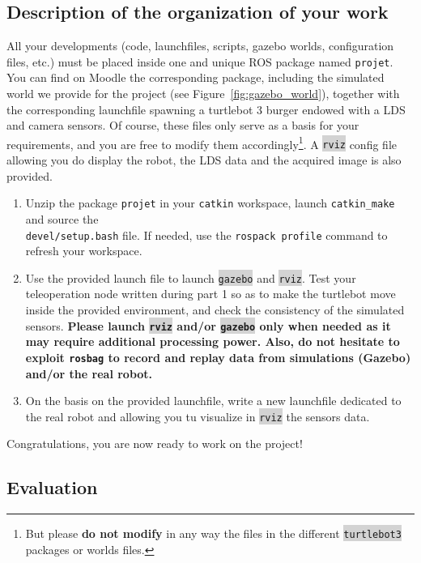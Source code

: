 \documentclass[10pt,a4paper,printanswers]{upmc}
\newcommand{\mytext}[1]{\colorbox{lightgray}{\texttt{#1}}}
\begin{document}
\subsection{Description of the organization of your work}

All your developments (code, launchfiles, scripts, gazebo worlds, configuration files, etc.) must be
placed inside one and unique ROS package named \texttt{projet}. You can find on Moodle the
corresponding package, including the simulated world we provide for the project (see
Figure~\ref{fig:gazebo_world}), together with the corresponding launchfile spawning a turtlebot 3
burger endowed with a LDS and camera sensors. Of course, these files only serve as a basis for your
requirements, and you are free to modify them accordingly\footnote{But please \textbf{do not modify}
  in any way the files in the different \mytext{turtlebot3} packages or worlds files.}. A
\mytext{rviz} config file allowing you do display the robot, the LDS data and the acquired image is
also provided.

\begin{enumerate}
  \item Unzip the package \texttt{projet} in your \texttt{catkin} workspace, launch
        \texttt{catkin\_make} and source the\\ \texttt{devel/setup.bash} file. If needed, use the
        \texttt{rospack profile} command to refresh your workspace.
  \item Use the provided launch file to launch \mytext{gazebo} and \mytext{rviz}. Test your
        teleoperation node written during part 1 so as to make the turtlebot move inside the
        provided environment, and check the consistency of the simulated sensors. \textbf{Please
          launch \mytext{rviz} and/or \mytext{gazebo} only when needed as it may require additional
          processing power. Also, do not hesitate to exploit \texttt{rosbag} to record and replay data
          from simulations (Gazebo) and/or the real robot.}
  \item On the basis on the provided launchfile, write a new launchfile dedicated to the real robot
        and allowing you tu visualize in \mytext{rviz} the sensors data.
\end{enumerate}

\noindent Congratulations, you are now ready to work on the project!

\subsection{Evaluation}
\end{document}
